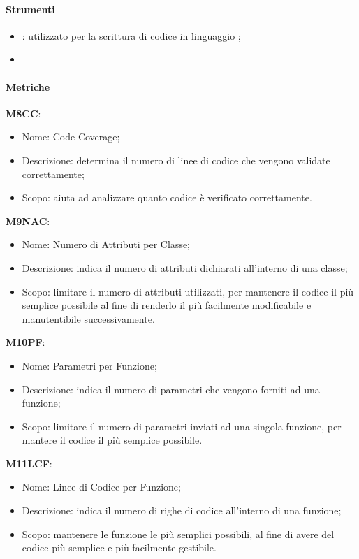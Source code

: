 		\paragraph{Strumenti} \hfill \break
		\begin{itemize}
      \item \textbf{}: utilizzato per la scrittura di codice in linguaggio ;
      \item 
    \end{itemize}

    \paragraph{Metriche}\hfill \break
    \textbf{M8CC}:
    \begin{itemize}
      \item Nome: Code Coverage;
      \item Descrizione: determina il numero di linee di codice che vengono validate correttamente;
      \item Scopo: aiuta ad analizzare quanto codice è verificato correttamente.
    \end{itemize}
    \textbf{M9NAC}:
    \begin{itemize}
      \item Nome: Numero di Attributi per Classe;
      \item Descrizione: indica il numero di attributi dichiarati all'interno di una classe;
      \item Scopo: limitare il numero di attributi utilizzati, per mantenere il codice il più semplice possibile al fine di renderlo il più facilmente modificabile e manutentibile successivamente.
    \end{itemize} 
    \textbf{M10PF}:
    \begin{itemize}
      \item Nome: Parametri per Funzione;
      \item Descrizione: indica il numero di parametri che vengono forniti ad una funzione;
      \item Scopo: limitare il numero di parametri inviati ad una singola funzione, per mantere il codice il più semplice possibile.
    \end{itemize}
    \textbf{M11LCF}:
    \begin{itemize}
      \item Nome: Linee di Codice per Funzione;
      \item Descrizione: indica il numero di righe di codice all'interno di una funzione;
      \item Scopo: mantenere le funzione le più semplici possibili, al fine di avere del codice più semplice e più facilmente gestibile.
    \end{itemize}    
